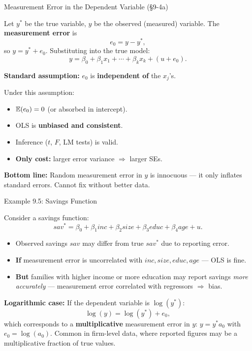 \documentclass[aspectratio=169, 12pt]{beamer}
\begin{document}
\begin{frame}[shrink=15]{Measurement Error in the Dependent Variable (\S9-4a)}

  Let $y^*$ be the true variable, $y$ be the observed (measured) variable. The
  \textbf{measurement error} is
  \[
    e_0 = y - y^*, \tag{9.24}
  \]
  so $y = y^* + e_0$. Substituting into the true model:
  \[
    y = \beta_0 + \beta_1 x_1 + \cdots + \beta_k x_k + (u + e_0). \tag{9.25}
  \]

  \begin{highlightbox}
    \textbf{Standard assumption:} $e_0$ is \textbf{independent of} the $x_j$'s.

    \medskip
    Under this assumption:
    \begin{itemize}\setlength{\itemsep}{1pt}
      \item $\operatorname{\mathbb{E}}(e_0) = 0$ (or absorbed in intercept).
      \item OLS is \textbf{unbiased and consistent}.
      \item Inference ($t$, $F$, LM tests) is valid.
      \item \textbf{Only cost:} larger error variance $\Rightarrow$ larger SEs.
    \end{itemize}
  \end{highlightbox}

  \begin{keybox}
    \textbf{Bottom line:} Random measurement error in $y$ is innocuous — it only inflates
    standard errors. Cannot fix without better data.
  \end{keybox}

\end{frame}

\begin{frame}[shrink=25]{Example 9.5: Savings Function}

  Consider a savings function:
  \[
    sav^* = \beta_0 + \beta_1 \mathit{inc} + \beta_2 \mathit{size} + \beta_3 \mathit{educ} + \beta_4 \mathit{age} + u.
  \]

  \begin{itemize}\setlength{\itemsep}{2pt}
    \item Observed savings $\mathit{sav}$ may differ from true $sav^*$ due to reporting error.
    \item \textbf{If} measurement error is uncorrelated with $inc, size, educ, age$ —
    OLS is fine.
    \item \textbf{But} families with higher income or more education may report savings
    \emph{more accurately} — measurement error correlated with regressors $\Rightarrow$ bias.
  \end{itemize}

  \begin{keybox}
    \textbf{Logarithmic case:} If the dependent variable is $\log(y^*)$:
    \[
      \log(y) = \log(y^*) + e_0,
    \]
    which corresponds to a \textbf{multiplicative} measurement error in $y$:
    $y = y^* a_0$ with $e_0 = \log(a_0)$.
    \medskip
    Common in firm-level data, where reported figures may be a multiplicative fraction
    of true values.
  \end{keybox}

\end{frame}
\end{document}
